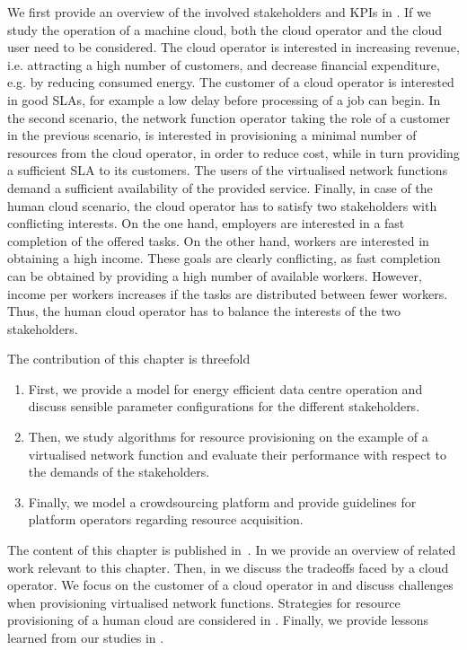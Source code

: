We first provide an overview of the involved stakeholders and \glspl{KPI} in .
If we study the operation of a machine cloud, both the cloud operator and the cloud user need to be considered.
The cloud operator is interested in increasing revenue, i.e. attracting a high number of customers, and decrease financial expenditure, e.g. by reducing consumed energy.
The customer of a cloud operator is interested in good \glspl{SLA}, for example a low delay before processing of a job can begin.
In the second scenario, the network function operator taking the role of a customer in the previous scenario, is interested in provisioning a minimal number of resources from the cloud operator, in order to reduce cost, while in turn providing a sufficient \gls{SLA} to its customers.
The users of the virtualised network functions demand a sufficient availability of the provided service.
Finally, in case of the human cloud scenario, the cloud operator has to satisfy two stakeholders with conflicting interests.
On the one hand, employers are interested in a fast completion of the offered tasks.
On the other hand, workers are interested in obtaining a high income.
These goals are clearly conflicting, as fast completion can be obtained by providing a high number of available workers.
However, income per workers increases if the tasks are distributed between fewer workers.
Thus, the human cloud operator has to balance the interests of the two stakeholders.

The contribution of this chapter is threefold
\begin{enumerate}
\item First, we provide a model for energy efficient data centre operation and discuss sensible parameter configurations for the different stakeholders. 
\item Then, we study algorithms for resource provisioning on the example of a virtualised network function and evaluate their performance with respect to the demands of the stakeholders.
\item Finally, we model a crowdsourcing platform and provide guidelines for platform operators regarding resource acquisition.
\end{enumerate}

The content of this chapter is published in~\cite{Schwartz2012a,Metzger2014a,Schwartz2015}.
In  we provide an overview of related work relevant to this chapter.
Then, in  we discuss the tradeoffs faced by a cloud operator.
We focus on the customer of a cloud operator in  and discuss challenges when provisioning virtualised network functions.
Strategies for resource provisioning of a human cloud are considered in .
Finally, we provide lessons learned from our studies in .





